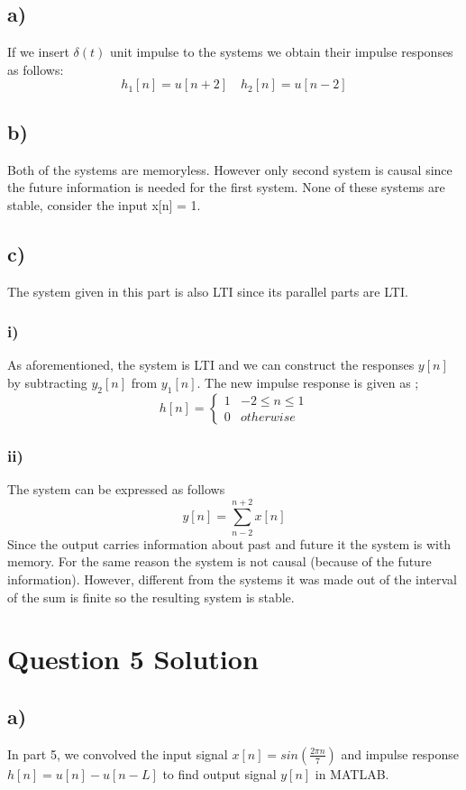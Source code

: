 \documentclass[letterpaper,12pt]{article}
\begin{document}
\subsection{a)}
If we insert \(\delta(t)\) unit impulse to the systems we obtain their impulse responses as follows:
\[h_1[n]=u[n+2]   \quad h_2[n]=u[n-2]\] 
\subsection{b)}
Both of the systems are memoryless. However only second system is causal since the future information is needed for the first system. None of these systems are stable, consider the input x[n] = 1. 
\subsection{c)}
The system given in this part is also LTI since its parallel parts are LTI.
\subsubsection{i)}
As aforementioned, the system is LTI and we can construct the responses \(y[n]\) by subtracting \(y_2[n]\) from \(y_1[n]\). The new impulse response is given as ; 
\[
h[n] = \begin{cases} 
    1 & -2 \leq n \leq 1 \\
    0 & otherwise 
 \end{cases}    
\]

\subsubsection{ii)}
The system can be expressed as follows 
\[
y[n] = \sum_{n-2}^{n+2} x[n]    
\] 
Since the output carries information about past and future it the system is with memory. For the same reason the system is not causal (because  of the future information). However, different from the systems it was made out of the interval of the sum is finite so the resulting system is stable. 
\section{Question 5 Solution}
\subsection{a)}
In part 5, we convolved the input signal \(x[n] = sin(\frac{2\pi n}{7} )\) and impulse response \(h[n] = u[n] - u[n-L]\) to find output signal \(y[n]\) in MATLAB.
\end{document}
